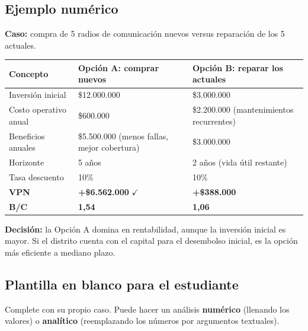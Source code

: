 \documentclass[11pt, a4paper]{article}
\begin{document}
\subsection{Ejemplo num\'erico}

\textbf{Caso:} compra de 5 radios de comunicaci\'on nuevos versus reparaci\'on de los 5 actuales.

\begin{center}
\begin{tabularx}{\textwidth}{@{}lXX@{}}
\toprule
\textbf{Concepto} & \textbf{Opci\'on A: comprar nuevos} & \textbf{Opci\'on B: reparar los actuales}\\
\midrule
Inversi\'on inicial & \$12.000.000 & \$3.000.000\\
Costo operativo anual & \$600.000 & \$2.200.000 (mantenimientos recurrentes)\\
Beneficios anuales & \$5.500.000 (menos fallas, mejor cobertura) & \$3.000.000\\
Horizonte & 5 a\~nos & 2 a\~nos (vida \'util restante)\\
Tasa descuento & 10\% & 10\%\\
\midrule
\textbf{VPN} & \textbf{+\$6.562.000} $\checkmark$ & \textbf{+\$388.000}\\
\textbf{B/C} & \textbf{1,54} & \textbf{1,06}\\
\bottomrule
\end{tabularx}
\end{center}

\begin{cajaExito}
\textbf{Decisi\'on:} la Opci\'on A domina en rentabilidad, aunque la inversi\'on inicial es mayor. Si el distrito cuenta con el capital para el desembolso inicial, es la opci\'on m\'as eficiente a mediano plazo.
\end{cajaExito}

\subsection{Plantilla en blanco para el estudiante}

Complete con su propio caso. Puede hacer un an\'alisis \textbf{num\'erico} (llenando los valores) o \textbf{anal\'itico} (reemplazando los n\'umeros por argumentos textuales).
\end{document}

